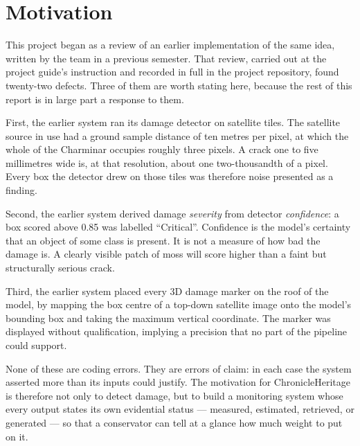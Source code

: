 \documentclass[a4paper,12pt,oneside]{book}
\begin{document}
\section{Motivation}
This project began as a review of an earlier implementation of the same idea, written by the team in a previous semester. That review, carried out at the project guide's instruction and recorded in full in the project repository, found twenty-two defects. Three of them are worth stating here, because the rest of this report is in large part a response to them.

First, the earlier system ran its damage detector on satellite tiles. The satellite source in use had a ground sample distance of ten metres per pixel, at which the whole of the Charminar occupies roughly three pixels. A crack one to five millimetres wide is, at that resolution, about one two-thousandth of a pixel. Every box the detector drew on those tiles was therefore noise presented as a finding.

Second, the earlier system derived damage \textit{severity} from detector \textit{confidence}: a box scored above 0.85 was labelled ``Critical''. Confidence is the model's certainty that an object of some class is present. It is not a measure of how bad the damage is. A clearly visible patch of moss will score higher than a faint but structurally serious crack.

Third, the earlier system placed every 3D damage marker on the roof of the model, by mapping the box centre of a top-down satellite image onto the model's bounding box and taking the maximum vertical coordinate. The marker was displayed without qualification, implying a precision that no part of the pipeline could support.

None of these are coding errors. They are errors of claim: in each case the system asserted more than its inputs could justify. The motivation for ChronicleHeritage is therefore not only to detect damage, but to build a monitoring system whose every output states its own evidential status --- measured, estimated, retrieved, or generated --- so that a conservator can tell at a glance how much weight to put on it.
\end{document}

